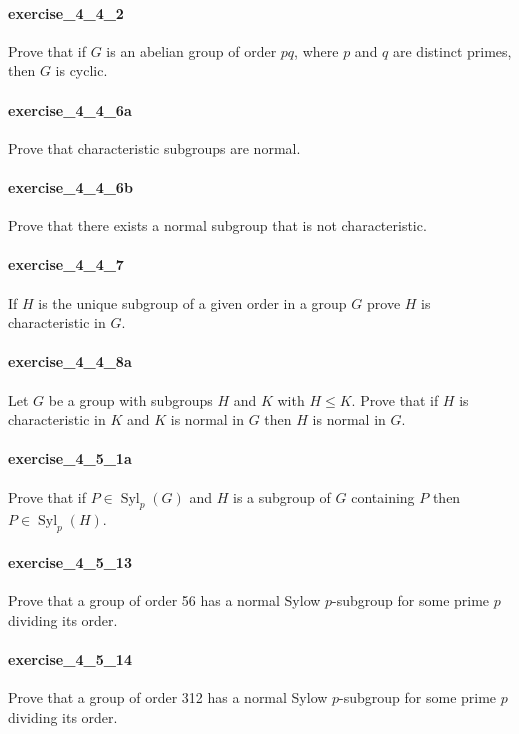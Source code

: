 \documentclass{article}
\begin{document}
\paragraph{exercise\_4\_4\_2} Prove that if $G$ is an abelian group of order $p q$, where $p$ and $q$ are distinct primes, then $G$ is cyclic.

\paragraph{exercise\_4\_4\_6a} Prove that characteristic subgroups are normal.

\paragraph{exercise\_4\_4\_6b} Prove that there exists a normal subgroup that is not characteristic.

\paragraph{exercise\_4\_4\_7} If $H$ is the unique subgroup of a given order in a group $G$ prove $H$ is characteristic in $G$.

\paragraph{exercise\_4\_4\_8a} Let $G$ be a group with subgroups $H$ and $K$ with $H \leq K$. Prove that if $H$ is characteristic in $K$ and $K$ is normal in $G$ then $H$ is normal in $G$.

\paragraph{exercise\_4\_5\_1a} Prove that if $P \in \operatorname{Syl}_{p}(G)$ and $H$ is a subgroup of $G$ containing $P$ then $P \in \operatorname{Syl}_{p}(H)$.

\paragraph{exercise\_4\_5\_13} Prove that a group of order 56 has a normal Sylow $p$-subgroup for some prime $p$ dividing its order.

\paragraph{exercise\_4\_5\_14} Prove that a group of order 312 has a normal Sylow $p$-subgroup for some prime $p$ dividing its order.
\end{document}

